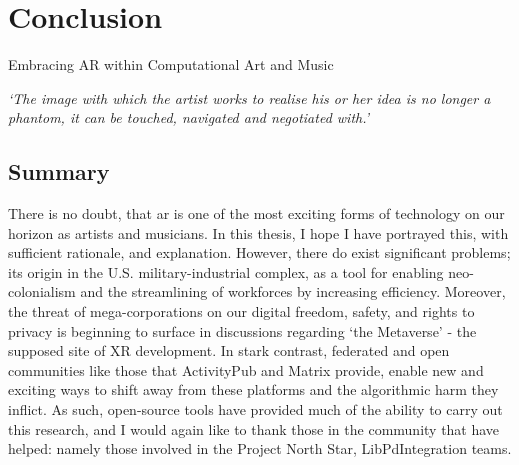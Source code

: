 \chapter{Conclusion}{Embracing AR within Computational Art and Music}
\label{sec: conclusion}
\epigraph{\textit{`The image with which the artist works to realise his or her idea is no longer a phantom, it can be touched, navigated and negotiated with.'}}{\citep[p.5]{ryan1991}}


\clearpage

\section{Summary}\label{sec: conclusion-summary}
There is no doubt, that \ac{ar} is one of the most exciting forms of technology on our horizon as artists and musicians. In this thesis, I hope I have portrayed this, with sufficient rationale, and explanation. However, there do exist significant problems; its origin in the U.S. military-industrial complex, as a tool for enabling neo-colonialism and the streamlining of workforces by increasing efficiency. Moreover, the threat of mega-corporations on our digital freedom, safety, and rights to privacy is beginning to surface in discussions regarding `the Metaverse' - the supposed site of XR development. In stark contrast, federated and open communities like those that ActivityPub and Matrix provide, enable new and exciting ways to shift away from these platforms and the algorithmic harm they inflict. As such, open-source tools have provided much of the ability to carry out this research, and I would again like to thank those in the community that have helped: namely those involved in the Project North Star, LibPdIntegration teams.

